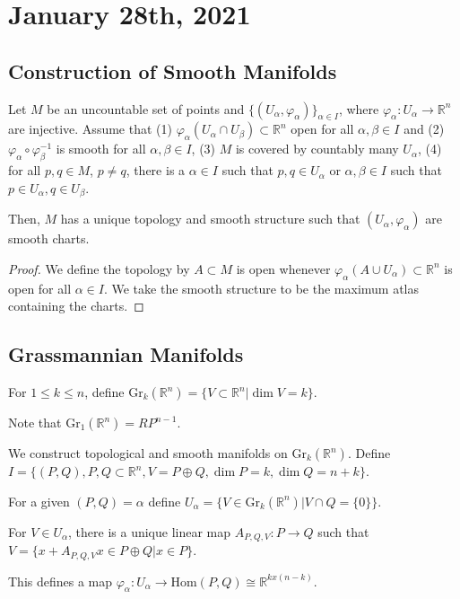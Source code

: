 \documentclass[12pt]{scrartcl}
\newcommand{\R}{\mathbb{R}}
\let \phi \varphi
\begin{document}
\section{January 28th, 2021}
\subsection{Construction of Smooth Manifolds}
\begin{lemma} Let $M$ be an uncountable set of points and $\{(U_\alpha, \phi_\alpha)\}_{\alpha \in I}$, where $\phi_\alpha: U_\alpha \to \R^n$ are injective.  Assume that (1) $\phi_\alpha(U_\alpha \cap U_\beta) \subset \R^n$ open for all $\alpha, \beta\in I$ and (2) $\phi_\alpha \circ \phi_\beta^{-1}$ is smooth for all $\alpha, \beta \in I$, (3) $M$ is covered by countably many $U_\alpha$, (4) for all $p, q \in M$, $p \ne q$, there is a $\alpha \in I$ such that $p, q \in U_\alpha$ or $\alpha, \beta \in I$ such that $p \in U_\alpha, q \in U_\beta$.

Then, $M$ has a unique topology and smooth structure such that $(U_\alpha, \phi_\alpha)$ are smooth charts.
\end{lemma}
\begin{proof}
We define the topology by $A \subset M$ is open whenever $\phi_\alpha(A \cup U_\alpha) \subset \R^n$ is open for all $\alpha \in I$.  We take the smooth structure to be the maximum atlas containing the charts.
\end{proof}
\subsection{Grassmannian Manifolds}
\begin{definition} For $1 \le k \le n$, define $\text{Gr}_k(\R^n) = \{V \subset \R^n | \dim V = k\}$.  
\end{definition}
Note that $\text{Gr}_1(\R^n) =  RP^{n-1}$.

We construct topological and smooth manifolds on $\text{Gr}_k(\R^n)$.  Define $I = \{(P, Q), P, Q \subset \R^n, V = P \oplus Q, \dim P = k, \dim Q = n+k\}.$

For a given $(P, Q) = \alpha$ define $U_\alpha = \{V \in \text{Gr}_k(\R^n) | V \cap Q = \{0\}\}.$
\begin{lemma} For $V \in U_\alpha$, there is a unique linear map $A_{P, Q, V}: P \to Q$ such that $V = \{x + A_{P, Q, V}x \in P \oplus Q | x \in P\}$.  

This defines a map $\phi_\alpha: U_\alpha \to \text{Hom}(P, Q) \cong \R^{kx(n-k)}$.
\end{lemma}
\end{document}
